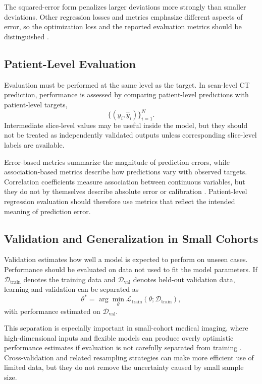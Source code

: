 The squared-error form penalizes larger deviations more strongly than smaller deviations. Other regression losses and metrics emphasize different aspects of error, so the optimization loss and the reported evaluation metrics should be distinguished \cite{terven2025lossmetrics,kocak2025medicalmetrics}.


\subsection{Patient-Level Evaluation}
\label{sec:patient_level_evaluation}

Evaluation must be performed at the same level as the target. In scan-level CT prediction, performance is assessed by comparing patient-level predictions with patient-level targets,
\[
\{(y_i, \hat{y}_i)\}_{i=1}^{N}.
\]
Intermediate slice-level values may be useful inside the model, but they should not be treated as independently validated outputs unless corresponding slice-level labels are available.

Error-based metrics summarize the magnitude of prediction errors, while association-based metrics describe how predictions vary with observed targets. Correlation coefficients measure association between continuous variables, but they do not by themselves describe absolute error or calibration \cite{schober2018correlation}. Patient-level regression evaluation should therefore use metrics that reflect the intended meaning of prediction error.


\subsection{Validation and Generalization in Small Cohorts}
\label{sec:validation_generalization_small_cohorts}

Validation estimates how well a model is expected to perform on unseen cases. Performance should be evaluated on data not used to fit the model parameters. If \(\mathcal{D}_{\mathrm{train}}\) denotes the training data and \(\mathcal{D}_{\mathrm{val}}\) denotes held-out validation data, learning and validation can be separated as
\[
\theta^{*}
=
\arg\min_{\theta}
\mathcal{L}_{\mathrm{train}}(\theta; \mathcal{D}_{\mathrm{train}}),
\]
with performance estimated on \(\mathcal{D}_{\mathrm{val}}\).

This separation is especially important in small-cohort medical imaging, where high-dimensional inputs and flexible models can produce overly optimistic performance estimates if evaluation is not carefully separated from training \cite{dhiman2023samplesize,litjens2017survey}. Cross-validation and related resampling strategies can make more efficient use of limited data, but they do not remove the uncertainty caused by small sample size.

